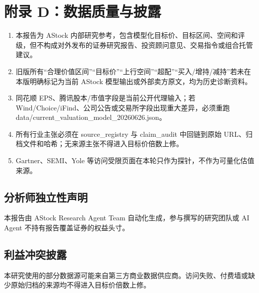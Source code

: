 
\section{附录 D：数据质量与披露}

\begin{enumerate}[label=(\arabic*)]
  \item 本报告为 AStock 内部研究参考，包含模型化目标价、目标区间、空间和评级，但不构成对外发布的证券研究报告、投资顾问意见、交易指令或组合托管建议。
  \item 旧版所有“合理价值区间”“目标价”“上行空间”“超配”“买入/增持/减持”若未在本版明确标记为当前 AStock 模型输出或外部卖方原文，均为历史诊断资料。
  \item 同花顺 EPS、腾讯股本/市值字段是当前公开代理输入；若 Wind/Choice/iFind、公司公告或交易所字段出现重大差异，必须重跑 data/current\_valuation\_model\_20260626.json。
  \item 所有行业主张必须在 source\_registry 与 claim\_audit 中回链到原始 URL、归档文件和哈希；无来源主张不得进入目标价倍数上修。
  \item Gartner、SEMI、Yole 等访问受限页面在本轮只作为探针，不作为可量化估值来源。
\end{enumerate}

\subsection{分析师独立性声明}
本报告由 AStock Research Agent Team 自动化生成，参与撰写的研究团队或 AI Agent 不持有报告覆盖证券的权益头寸。

\subsection{利益冲突披露}
本研究使用的部分数据源可能来自第三方商业数据供应商。访问失败、付费墙或缺少原始归档的来源均不得进入目标价倍数上修。
